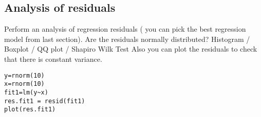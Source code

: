 \subsection{Analysis of residuals}
Perform an analysis of regression residuals ( you can pick the best regression model from last section).
Are the residuals normally distributed?
	Histogram /  Boxplot / QQ plot / Shapiro Wilk Test
Also you can plot the residuals to check that there is constant variance.
\begin{verbatim}
y=rnorm(10)
x=rnorm(10)
fit1=lm(y~x)
res.fit1 = resid(fit1)
plot(res.fit1)
\end{verbatim}
